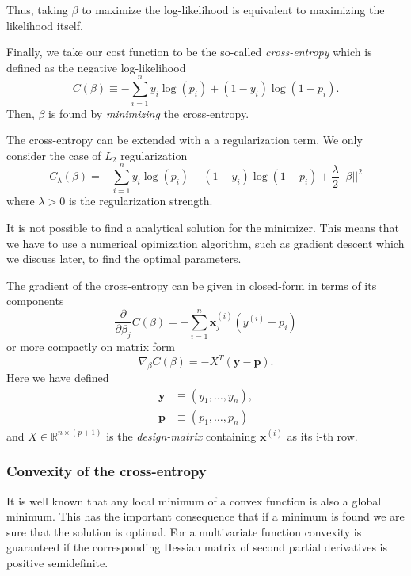 \documentclass[a4paper, twocolumn]{article}
\begin{document}
Thus, taking $\beta$ to maximize the log-likelihood is equivalent to maximizing the likelihood itself. 

Finally, we take our 
cost function to be the so-called \textit{cross-entropy} which is defined as the negative log-likelihood 
\begin{equation}
 C(\beta) \equiv   -\sum_{i=1}^n y_i \log(p_i) + (1-y_i) \log(1-p_i) \label{logRegCrossEntropy}.
\end{equation}
Then, $\beta$ is found by \textit{minimizing} the cross-entropy. 

The cross-entropy can be extended with a 
a regularization term. We only consider the case of $L_2$ regularization
\begin{equation}
 C_\lambda (\beta) = -\sum_{i=1}^n y_i \log(p_i) + (1-y_i) \log(1-p_i) + \frac{\lambda}{2} ||\beta||^2 \label{reglogRegCrossEntropy}
\end{equation}
where $\lambda > 0$ is the regularization strength.

It is not possible to find a analytical solution for the minimizer. This means that we have to use a
numerical opimization algorithm, such as gradient descent which we discuss later, to find the optimal parameters.

The gradient of the cross-entropy can be given in closed-form in terms of its components
\begin{equation}
 \frac{\partial}{\partial \beta_j} C(\beta) = - \sum_{i=1}^n \mathbf{x}_j^{(i)} \left( y^{(i)} - p_i \right)
\end{equation}
or more compactly on matrix form
\begin{equation}
 \nabla_\beta C(\beta) = - X^{T} \left( \mathbf{y} - \mathbf{p} \right). 
\end{equation}
Here we have defined \begin{align}
\mathbf{y} &\equiv (y_1,\dots,y_n), \\       
      \mathbf{p} &\equiv \left( p_1,\dots,p_n \right)
      \end{align}
and $X \in \mathbb{R}^{n \times (p+1)}$ is the \textit{design-matrix} containing $\mathbf{x}^{(i)}$ as its i-th row.
\subsubsection{Convexity of the cross-entropy}
It is well known that any local minimum of a convex function is also a global minimum. This has the important consequence 
that if a minimum is found we are sure that the solution is optimal. For a multivariate function convexity is guaranteed 
if the corresponding Hessian matrix of second partial derivatives is positive semidefinite.
\end{document}
